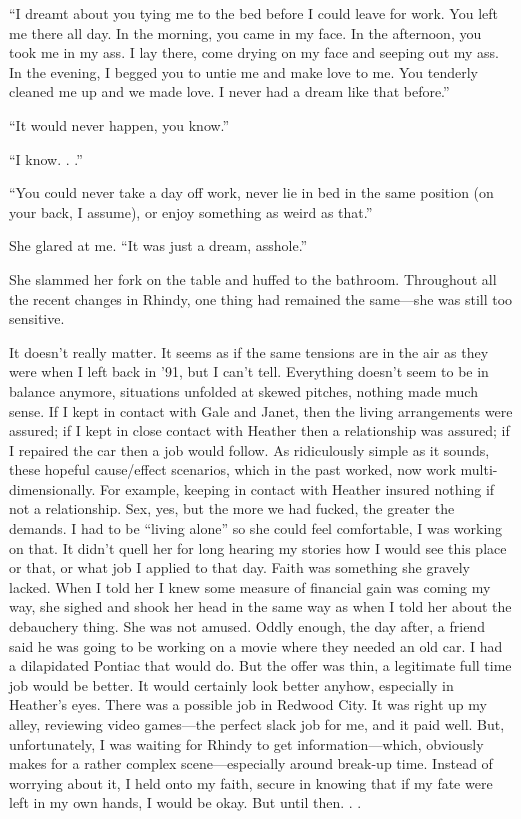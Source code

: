 ``I dreamt about you tying me to the bed before I could leave for work.
You left me there all day. In the morning, you came in my face. In the
afternoon, you took me in my ass. I lay there, come drying on my face
and seeping out my ass. In the evening, I begged you to untie me and
make love to me. You tenderly cleaned me up and we made love. I never
had a dream like that before.''

``It would never happen, you know.''

``I know. . .''

``You could never take a day off work, never lie in bed in the same
position (on your back, I assume), or enjoy something as weird as
that.''

She glared at me. ``It was just a dream, asshole.''

She slammed her fork on the table and huffed to the bathroom. Throughout
all the recent changes in Rhindy, one thing had remained the same---she
was still too sensitive.

It doesn't really matter. It seems as if the same tensions are in the
air as they were when I left back in '91, but I can't tell. Everything
doesn't seem to be in balance anymore, situations unfolded at skewed
pitches, nothing made much sense. If I kept in contact with Gale and
Janet, then the living arrangements were assured; if I kept in close
contact with Heather then a relationship was assured; if I repaired the
car then a job would follow. As ridiculously simple as it sounds, these
hopeful cause/effect scenarios, which in the past worked, now work
multi-dimensionally. For example, keeping in contact with Heather
insured nothing if not a relationship. Sex, yes, but the more we had
fucked, the greater the demands. I had to be ``living alone'' so she
could feel comfortable, I was working on that. It didn't quell her for
long hearing my stories how I would see this place or that, or what job
I applied to that day. Faith was something she gravely lacked. When I
told her I knew some measure of financial gain was coming my way, she
sighed and shook her head in the same way as when I told her about the
debauchery thing. She was not amused. Oddly enough, the day after, a
friend said he was going to be working on a movie where they needed an
old car. I had a dilapidated Pontiac that would do. But the offer was
thin, a legitimate full time job would be better. It would certainly
look better anyhow, especially in Heather's eyes. There was a possible
job in Redwood City. It was right up my alley, reviewing video
games---the perfect slack job for me, and it paid well. But,
unfortunately, I was waiting for Rhindy to get information---which,
obviously makes for a rather complex scene---especially around break-up
time. Instead of worrying about it, I held onto my faith, secure in
knowing that if my fate were left in my own hands, I would be okay. But
until then. . .

